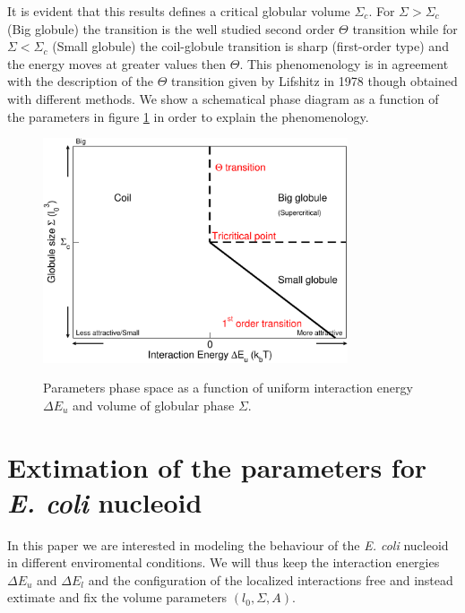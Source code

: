 \documentclass[12pt,a4paper,notitlepage]{article}
\newcommand{\ecoli}{\emph{E. coli}\xspace}
\begin{document}
It is evident that this results defines a critical globular volume
$\Sigma_c$. For $\Sigma > \Sigma_c$ (Big globule) the transition is
the well studied second order $\Theta$ transition while for $\Sigma <
\Sigma_c$ (Small globule) the coil-globule transition is sharp
(first-order type) and the energy moves at greater values then
$\Theta$. This phenomenology is in agreement with the description of
the $\Theta$ transition given by Lifshitz in 1978 though obtained with
different methods\cite{Lifshitz1978}. We show a schematical phase
diagram as a function of the parameters in figure \ref{fig:unifphas} in
order to explain the phenomenology.

\begin{figure}[h!]
\centering
\includegraphics[width=9cm]{uniform_phases}\\
\caption{Parameters phase space as a function of uniform interaction
  energy $\Delta E_u$ and volume of globular phase $\Sigma$.}
\label{fig:unifphas}
\end{figure}

\section{Extimation of the parameters for \ecoli nucleoid}

In this paper we are interested in modeling the behaviour of the
\ecoli nucleoid in different enviromental conditions. We will thus
keep the interaction energies $\Delta E_u$ and $\Delta E_l$ and the
configuration of the localized interactions free and instead extimate
and fix the volume parameters $(l_0, \Sigma, A)$.
\end{document}
